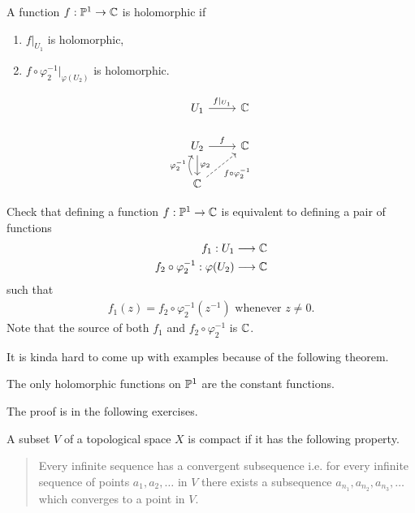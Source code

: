 \documentclass{article}
\begin{document}
    A function $f: \mathbb{P}^1 \rightarrow \mathbb{C}$ is holomorphic if
    \begin{enumerate}
      \item $f|_{U_1}$ is holomorphic,
      \item $f \circ \varphi_2^{-1}|_{\varphi(U_2)}$ is holomorphic.
    \end{enumerate}
    \begin{equation*}
      \begin{tikzcd}
        U_1 \ar[r,"f|_{U_1}"] &  \bbc\\
        U_2 \ar[d, "\varphi_2"] \ar[r, "f"] & \bbc \\
        \bbc \ar[u, "\varphi_2^{-1}", bend left] \ar[ur, "f \circ \varphi_2^{-1}", swap, dashed]
      \end{tikzcd}
    \end{equation*}

    \begin{qbox}
      Check that defining a function $f: \mathbb{P}^1 \rightarrow \mathbb{C}$ is equivalent to defining a pair of functions
      \begin{align*}
        f_1: U_1 &\longrightarrow \mathbb{C} \\
        f_2 \circ \varphi_2^{-1}: \varphi(U_2) &\longrightarrow \mathbb{C} \\
      \end{align*}
      such that
      \begin{align*}
        f_1(z) = f_2 \circ \varphi_2^{-1}(z^{-1}) \mbox{ whenever } z \neq 0.
      \end{align*}
      Note that the source of both $f_1$ and $f_2 \circ \varphi_2^{-1}$ is $\mathbb{C}$.
    \end{qbox}

    It is kinda hard to come up with examples because of the following theorem.

    \begin{theorem}
      The only holomorphic functions on $\mathbb{P}^1$ are the constant functions.
    \end{theorem}
    The proof is in the following exercises.

    A subset $V$ of a topological space $X$ is compact if it has the following property.
    \begin{quote}
      Every infinite sequence has a convergent subsequence i.e. for every infinite sequence of points $a_1, a_2, \dots $ in $V$ there exists a subsequence $a_{n_1}, a_{n_2}, a_{n_3}, \dots$ which converges to a point in $V$.
    \end{quote}
\end{document}
